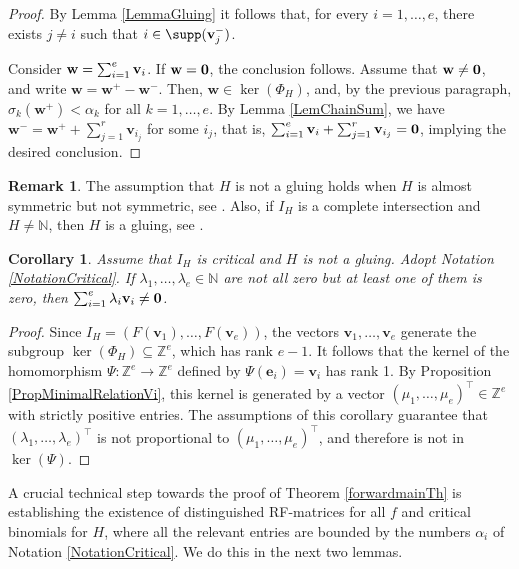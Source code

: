 \documentclass[11pt,twoside]{amsart}
\newcommand{\Z}{\mathbb Z}
\newcommand{\N}{\mathbb N}
\def\bv{{\mathbf v}}
\def\bw{{\mathbf w}}
\def\be{{\mathbf e}}
\def\al{\alpha}
\newtheorem{cor}[Theorem]{Corollary}
\theoremstyle{definition}
\newtheorem{rem}[Theorem]{Remark}
\numberwithin{equation}{section}
\begin{document}
\begin{proof}
By Lemma \ref{LemmaGluing} it follows that, for every $i=1, \ldots, e$, there exists $j \ne i$ such that $i\in \supp({\bf v}^-_j)$.
 

Consider $\bw =  \sum_{i=1}^e {\bf v}_i$. 
If $\bw = {\bf 0}$,  the conclusion follows. 
Assume  that $\bw \ne {\bf 0}$, and 
write $\bw= \bw^+ - \bw^-$. 
Then, $\bw \in \ker(\Phi_H)$, and, by the previous paragraph, 
$\sigma_k(\bw^+)<\al_k$ for all $k = 1, \ldots, e$.
By Lemma \ref{LemChainSum}, 
we have
$\bw^- = \bw^+ +\sum_{j=1}^r\bv_{i_j}$ for some $i_j$,
that is,  $\sum_{i=1}^e\bv_{i}+\sum_{j=1}^r\bv_{i_j}={\bf 0}$, 
implying the desired conclusion.
\end{proof}

\begin{rem}\label{RemNotGluing}
The assumption that $H$ is not a gluing holds when 
$H$ is almost symmetric but not symmetric, 
see \cite[Theorems 6.3 and 6.7]{N}.
Also, if $I_H$ is a complete intersection and $H \ne \N$, then $H$ is a gluing, see \cite[Proposition 9]{Delorme}. 
\end{rem}

\begin{cor}\label{new3.2}
Assume that $I_H$ is critical and  $H$ is not a gluing. 
Adopt Notation \ref{NotationCritical}.
If $\lambda_1, \ldots, \lambda_e\in \N$ are not all zero but  at least one of them is zero,
then $\sum_{i=1}^e \lambda_i \bv_i \ne {\bf 0}$.
\end{cor}


\begin{proof}
Since $I_H = (F(\bv_1), \ldots, F(\bv_e))$, the vectors $\bv_1, \ldots, \bv_e$ generate the subgroup $\ker(\Phi_H)  \subseteq \Z^e$, which has rank $e-1$. 
It follows that the kernel of the homomorphism $\Psi : \Z^e \to \Z^e$ defined by $\Psi(\be_i) = \bv_i$ has rank 1.
By Proposition \ref{PropMinimalRelationVi}, this kernel is generated by a vector $(\mu_1, \ldots, \mu_e)^\intercal \in\Z^e$ with strictly positive entries.
The assumptions of this corollary guarantee that 
$(\lambda_1, \ldots, \lambda_e)^\intercal $ is not proportional to 
$(\mu_1, \ldots, \mu_e)^\intercal $,
and therefore is not in $\ker(\Psi)$.
\end{proof}

A crucial technical step towards the proof of Theorem \ref{forwardmainTh} is establishing the existence of distinguished RF-matrices for all $f$ and critical binomials for $H$, where all the relevant entries are bounded by the numbers $\alpha_i$ of Notation \ref{NotationCritical}. 
We do this in the next two lemmas.
\end{document}
